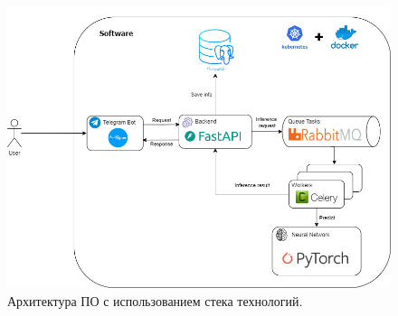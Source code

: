 \documentclass[a4paper,12pt]{extarticle}
\begin{document}
\begin{figure}[ht]
	\centering
	\includegraphics[scale=0.5]{app-arch.png}
	\caption{Архитектура ПО с использованием стека технологий.}
	\label{fig:app-arch}
\end{figure}
\end{document}
